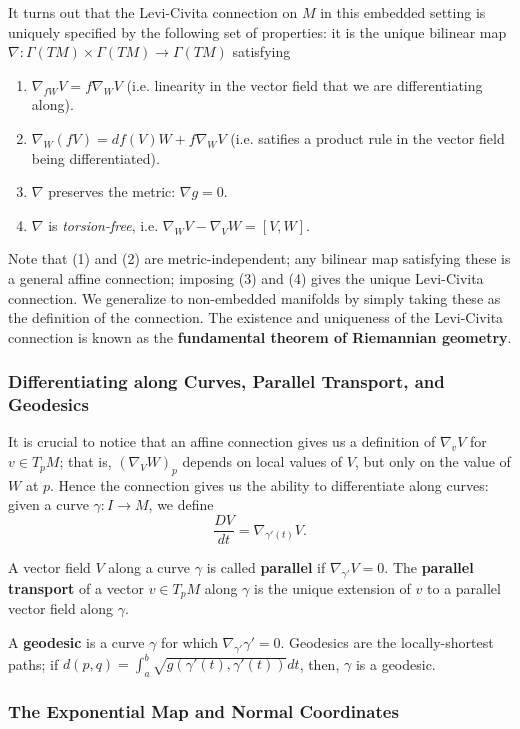 \documentclass[reqno]{amsart}
\numberwithin{equation}{section}
\begin{document}
It turns out that the Levi-Civita connection on $M$ in this embedded setting
is uniquely specified by the following set of properties: it is the unique bilinear map
$\nabla : \Gamma(TM) \times \Gamma(TM) \to \Gamma(TM)$ satisfying
\begin{enumerate}
    \item $\nabla_{f W} V = f \nabla_W V$ (i.e. linearity in the vector field that we are differentiating along).
    \item $\nabla_W (fV) = df(V)W + f \nabla_W V$ (i.e. satifies a product rule in the vector field being differentiated).
    \item $\nabla$ preserves the metric: $\nabla g = 0$.
    \item $\nabla$ is \emph{torsion-free}, i.e. $\nabla_W V - \nabla_V W = [V, W]$.
\end{enumerate}
Note that (1) and (2) are metric-independent; any bilinear map satisfying these is a general affine connection;
imposing (3) and (4) gives the unique Levi-Civita connection. We generalize to non-embedded manifolds by simply
taking these as the definition of the connection. The existence and uniqueness of the
Levi-Civita connection is known as the \textbf{fundamental theorem of Riemannian
geometry}.

\subsubsection{Differentiating along Curves, Parallel Transport, and Geodesics}

It is crucial to notice that an affine connection gives us a definition of $\nabla_v V$ for $v \in T_pM$; that is,
$(\nabla_V W)_p$ depends on local values of $V$, but only on the value of $W$ at $p$. Hence the connection gives
us the ability to differentiate along curves: given a curve $\gamma : I \to M$, we define
$$
    \frac{DV}{dt} = \nabla_{\gamma'(t)} V.
$$

A vector field $V$ along a curve $\gamma$ is called \textbf{parallel} if $\nabla_{\gamma'} V = 0$.
The \textbf{parallel transport} of a vector $v \in T_pM$ along $\gamma$ is the unique extension of $v$
to a parallel vector field along $\gamma$.

A \textbf{geodesic} is a curve $\gamma$ for which $\nabla_{\gamma'} \gamma' = 0$. Geodesics are the locally-shortest
paths; if $d(p,q) = \int_a^b \sqrt{g(\gamma'(t), \gamma'(t))} dt$, then, $\gamma$ is a geodesic.

\subsubsection{The Exponential Map and Normal Coordinates}
\end{document}

